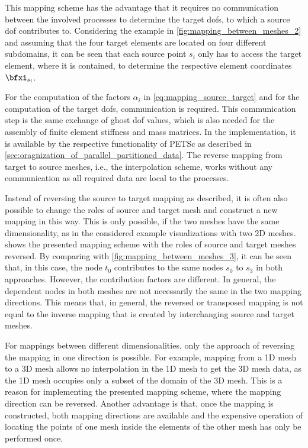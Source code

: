 This mapping scheme has the advantage that it requires no communication between the involved processes to determine the target dofs, to which a source dof contributes to. Considering the example in \cref{fig:mapping_between_meshes_2} and assuming that the four target elements are located on four different subdomains, it can be seen that each source point $s_i$ only has to access the target element, where it is contained, to determine the respective element coordinates $\bfxi_{s_i}$.

For the computation of the factors $\alpha_i$ in \cref{eq:mapping_source_target} and for the computation of the target dofs, communication is required. This communication step is the same exchange of ghost dof values, which is also needed for the assembly of finite element stiffness and mass matrices. In the implementation, it is available by the respective functionality of PETSc as described in \cref{sec:oragnization_of_parallel_partitioned_data}.
The reverse mapping from target to source meshes, i.e., the interpolation scheme, works without any communication as all required data are local to the processes.

Instead of reversing the source to target mapping as described, it is often also possible to change the roles of source and target mesh and construct a new mapping in this way. This is only possible, if the two meshes have the same dimensionality, as in the considered example visualizations with two 2D meshes.  shows the presented mapping scheme with the roles of source and target meshes reversed.
By comparing with \cref{fig:mapping_between_meshes_3}, it can be seen that, in this case, the node $t_0$ contributes to the same nodes $s_0$ to $s_3$ in both approaches. However, the contribution factors are different. In general, the dependent nodes in both meshes are not necessarily the same in the two mapping directions. This means that, in general, the reversed or transposed mapping is not equal to the inverse mapping that is created by interchanging source and target meshes.

For mappings between different dimensionalities, only the approach of reversing the mapping in one direction is possible. For example, mapping from a 1D mesh to a 3D mesh allows no interpolation in the 1D mesh to get the 3D mesh data, as the 1D mesh occupies only a subset of the domain of the 3D mesh. This is a reason for implementing the presented mapping scheme, where the mapping direction can be reversed. Another advantage is that, once the mapping is constructed, both mapping directions are available and the expensive operation of locating the points of one mesh inside the elements of the other mesh has only be performed once.

